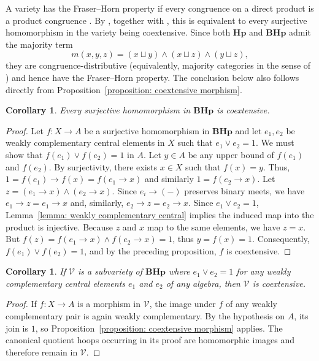 \documentclass[11pt]{article}
\theoremstyle{pretty}
\newtheorem{corollary}[theorem]{Corollary}
\theoremstyle{plainnote}
\renewcommand{\2}{\mathbf{2}}
\newcommand{\V}{\mathcal{V}}
\newcommand{\Hoop}{\mathbf{Hp}}
\newcommand{\BoundedHoop}{\mathbf{BHp}}
\begin{document}
A variety has the Fraser--Horn property if every congruence on a direct product is a product congruence \cite{FraserHorn1970}. By \cite[Proposition~7.2]{Hoefnagel2020}, together with \cite[Proposition~3.30]{HoefnagelTheart2025}, this is equivalent to every surjective homomorphism in the variety being coextensive. Since both $\Hoop$ and $\BoundedHoop$ admit the majority term
\[
m(x,y,z)=(x\sqcup y)\wedge(x\sqcup z)\wedge(y\sqcup z),
\]
they are congruence-distributive (equivalently, majority categories in the sense of \cite{Hoefnagel2019MajorityCategories}) and hence have the Fraser--Horn property. The conclusion below also follows directly from Proposition~\ref{proposition: coextensive morphism}.
\begin{corollary} \label{cor: surjective_coextensive}
Every surjective homomorphism in $\BoundedHoop$ is coextensive. 
\end{corollary}
\begin{proof}
Let $f \colon X \to A$ be a surjective homomorphism in $\BoundedHoop$ and let $e_1, e_2$ be weakly complementary central elements in $X$ such that $e_1 \vee e_2 = 1$. We must show that $f(e_1) \vee f(e_2) = 1$ in $A$. Let $y \in A$ be any upper bound of $f(e_1)$ and $f(e_2)$. By surjectivity, there exists $x \in X$ such that $f(x) = y$. Thus, $1 = f(e_1) \to f(x) = f(e_1 \to x)$ and similarly $1 = f(e_2 \to x)$. Let $z = (e_1 \to x) \wedge (e_2 \to x)$. Since $e_i\to(-)$ preserves binary meets, we have $e_1 \to z=e_1\to x$ and, similarly, $e_2 \to z=e_2\to x$. Since $e_1 \vee e_2 = 1$, Lemma~\ref{lemma: weakly complementary central} implies the induced map into the product is injective. Because $z$ and $x$ map to the same elements, we have $z = x$. But $f(z) = f(e_1 \to x) \wedge f(e_2 \to x) = 1$, thus $y = f(x) = 1$. Consequently, $f(e_1) \vee f(e_2) = 1$, and by the preceding proposition, $f$ is coextensive.
\end{proof}

\begin{corollary} \label{cor: subvariety_coextensive}
If $\V$ is a subvariety of $\BoundedHoop$ where $e_1 \vee e_2 = 1$ for any weakly complementary central elements $e_1$ and $e_2$ of any algebra, then $\V$ is coextensive. 
\end{corollary}
\begin{proof}
If $f:X\to A$ is a morphism in $\V$, the image under $f$ of any weakly complementary pair is again weakly complementary. By the hypothesis on $A$, its join is $1$, so Proposition~\ref{proposition: coextensive morphism} applies. The canonical quotient hoops occurring in its proof are homomorphic images and therefore remain in $\V$.
\end{proof}
\end{document}

